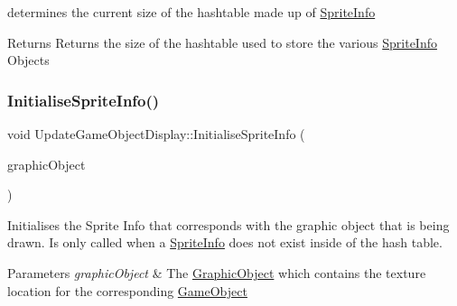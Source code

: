 determines the current size of the hashtable made up of \hyperlink{struct_sprite_info}{Sprite\+Info} 

\begin{DoxyReturn}{Returns}
Returns the size of the hashtable used to store the various \hyperlink{struct_sprite_info}{Sprite\+Info} Objects 
\end{DoxyReturn}
\mbox{\label{class_update_game_object_display_ab9405bbbabaa083cfdaefbbe84cb7cd4}} 
\subsubsection{\texorpdfstring{Initialise\+Sprite\+Info()}{InitialiseSpriteInfo()}}
{\footnotesize\ttfamily void Update\+Game\+Object\+Display\+::\+Initialise\+Sprite\+Info (\begin{DoxyParamCaption}\item[{const \hyperlink{class_graphic_object}{Graphic\+Object} \&}]{graphic\+Object }\end{DoxyParamCaption})\hspace{0.3cm}{\ttfamily [private]}}



Initialises the Sprite Info that corresponds with the graphic object that is being drawn. Is only called when a \hyperlink{struct_sprite_info}{Sprite\+Info} does not exist inside of the hash table. 


\begin{DoxyParams}{Parameters}
{\em graphic\+Object} & The \hyperlink{class_graphic_object}{Graphic\+Object} which contains the texture location for the corresponding \hyperlink{class_game_object}{Game\+Object} \\
\hline
\end{DoxyParams}
\mbox{\label{class_update_game_object_display_a05f0b24dfb3e2206b0d363dbc5127139}} 
